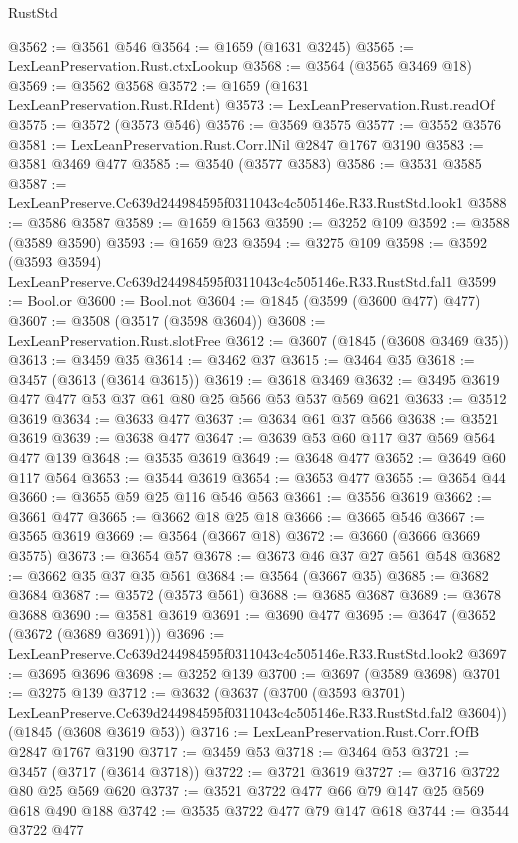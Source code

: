 \begin{lexlean}{RustStd}
\begin{coremodule}
@3562 := @3561 @546
@3564 := @1659 (@1631 @3245)
@3565 := LexLeanPreservation.Rust.ctxLookup
@3568 := @3564 (@3565 @3469 @18)
@3569 := @3562 @3568
@3572 := @1659 (@1631 LexLeanPreservation.Rust.RIdent)
@3573 := LexLeanPreservation.Rust.readOf
@3575 := @3572 (@3573 @546)
@3576 := @3569 @3575
@3577 := @3552 @3576
@3581 := LexLeanPreservation.Rust.Corr.lNil @2847 @1767 @3190
@3583 := @3581 @3469 @477
@3585 := @3540 (@3577 @3583)
@3586 := @3531 @3585
@3587 := LexLeanPreserve.Cc639d244984595f0311043c4c505146e.R33.RustStd.look1
@3588 := @3586 @3587
@3589 := @1659 @1563
@3590 := @3252 @109
@3592 := @3588 (@3589 @3590)
@3593 := @1659 @23
@3594 := @3275 @109
@3598 := @3592 (@3593 @3594) LexLeanPreserve.Cc639d244984595f0311043c4c505146e.R33.RustStd.fal1
@3599 := Bool.or
@3600 := Bool.not
@3604 := @1845 (@3599 (@3600 @477) @477)
@3607 := @3508 (@3517 (@3598 @3604))
@3608 := LexLeanPreservation.Rust.slotFree
@3612 := @3607 (@1845 (@3608 @3469 @35))
@3613 := @3459 @35
@3614 := @3462 @37
@3615 := @3464 @35
@3618 := @3457 (@3613 (@3614 @3615))
@3619 := @3618 @3469
@3632 := @3495 @3619 @477 @477 @53 @37 @61 @80 @25 @566 @53 @537 @569 @621
@3633 := @3512 @3619
@3634 := @3633 @477
@3637 := @3634 @61 @37 @566
@3638 := @3521 @3619
@3639 := @3638 @477
@3647 := @3639 @53 @60 @117 @37 @569 @564 @477 @139
@3648 := @3535 @3619
@3649 := @3648 @477
@3652 := @3649 @60 @117 @564
@3653 := @3544 @3619
@3654 := @3653 @477
@3655 := @3654 @44
@3660 := @3655 @59 @25 @116 @546 @563
@3661 := @3556 @3619
@3662 := @3661 @477
@3665 := @3662 @18 @25 @18
@3666 := @3665 @546
@3667 := @3565 @3619
@3669 := @3564 (@3667 @18)
@3672 := @3660 (@3666 @3669 @3575)
@3673 := @3654 @57
@3678 := @3673 @46 @37 @27 @561 @548
@3682 := @3662 @35 @37 @35 @561
@3684 := @3564 (@3667 @35)
@3685 := @3682 @3684
@3687 := @3572 (@3573 @561)
@3688 := @3685 @3687
@3689 := @3678 @3688
@3690 := @3581 @3619
@3691 := @3690 @477
@3695 := @3647 (@3652 (@3672 (@3689 @3691)))
@3696 := LexLeanPreserve.Cc639d244984595f0311043c4c505146e.R33.RustStd.look2
@3697 := @3695 @3696
@3698 := @3252 @139
@3700 := @3697 (@3589 @3698)
@3701 := @3275 @139
@3712 := @3632
    (@3637
      (@3700
        (@3593 @3701)
        LexLeanPreserve.Cc639d244984595f0311043c4c505146e.R33.RustStd.fal2
        @3604))
    (@1845 (@3608 @3619 @53))
@3716 := LexLeanPreservation.Rust.Corr.fOfB @2847 @1767 @3190
@3717 := @3459 @53
@3718 := @3464 @53
@3721 := @3457 (@3717 (@3614 @3718))
@3722 := @3721 @3619
@3727 := @3716 @3722 @80 @25 @569 @620
@3737 := @3521 @3722 @477 @66 @79 @147 @25 @569 @618 @490 @188
@3742 := @3535 @3722 @477 @79 @147 @618
@3744 := @3544 @3722 @477

\end{coremodule}
\end{lexlean}
